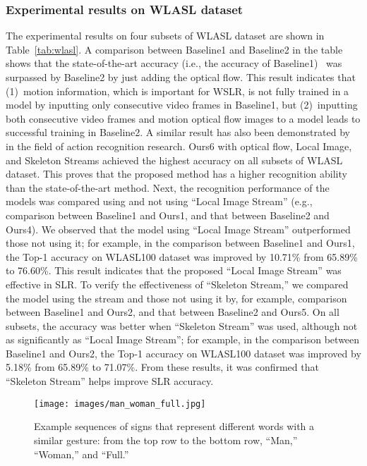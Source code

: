 \documentclass[journal]{IEEEtran}
\begin{document}
\subsubsection{Experimental results on WLASL dataset}
The experimental results on four subsets of WLASL dataset are shown in Table~\ref{tab:wlasl}.
A comparison between Baseline1 and Baseline2 in the table shows that the state-of-the-art accuracy (i.e., the accuracy of Baseline1)~\cite{li2020word} was surpassed by Baseline2 by just adding the optical flow.
This result indicates that (1)~motion information, which is important for WSLR, is not fully trained in a model by inputting only consecutive video frames in Baseline1, but (2)~inputting both consecutive video frames and motion optical flow images to a model leads to successful training in Baseline2.
A similar result has also been demonstrated by~\cite{joao2017i3d} in the field of action recognition research.
Ours6 with optical flow, Local Image, and Skeleton Streams achieved the highest accuracy on all subsets of WLASL dataset.
This proves that the proposed method has a higher recognition ability than the state-of-the-art method.
Next, the recognition performance of the models was compared using and not using ``Local Image Stream'' (e.g., comparison between Baseline1 and Ours1, and that between Baseline2 and Ours4).
We observed that the model using ``Local Image Stream'' outperformed those not using it; for example, in the comparison between Baseline1 and Ours1, the Top-1 accuracy on WLASL100 dataset was improved by 10.71\% from 65.89\% to 76.60\%.
This result indicates that the proposed ``Local Image Stream'' was effective in SLR.
To verify the effectiveness of ``Skeleton Stream,'' we compared the model using the stream and those not using it by, for example, comparison between Baseline1 and Ours2, and that between Baseline2 and Ours5.
On all subsets, the accuracy was better when ``Skeleton Stream'' was used, although not as significantly as ``Local Image Stream''; for example, in the comparison between Baseline1 and Ours2, the Top-1 accuracy on WLASL100 dataset was improved by 5.18\% from 65.89\% to 71.07\%.
From these results, it was confirmed that ``Skeleton Stream'' helps improve SLR accuracy.

\begin{figure}[tb]
  \centering
    \texttt{[image: images/man\_woman\_full.jpg]}
  \caption{Example sequences of signs that represent different words with a similar gesture: from the top row to the bottom row, ``Man,'' ``Woman,'' and ``Full.''}
  \label{fig:man}
\end{figure}
\end{document}

